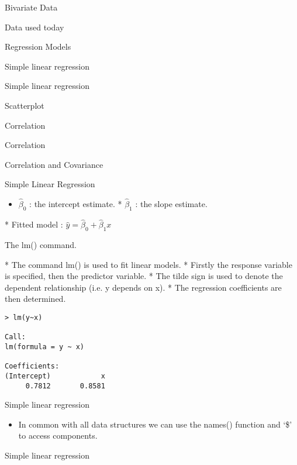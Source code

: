 \begin{slide}{Bivariate Data}
\begin{slide}{Data used today}
\begin{slide}{Regression Models}
\begin{slide}{Simple linear regression}
\begin{slide}{Simple linear regression}
\begin{slide}{Scatterplot}
\begin{slide}{Correlation}
\begin{slide}{Correlation}
\begin{slide}{Correlation and Covariance}
\begin{slide}{Simple Linear Regression}
\begin{itemize}
\begin{itemize}
\item
 $\hat{\beta}_{0}$ : the intercept estimate.
* $\hat{\beta}_{1}$ : the slope estimate.
\end{itemize}
* Fitted model : $\hat{y}=\hat{\beta}_{0} + \hat{\beta}_{1}x $
\end{itemize}





\begin{slide}{The lm() command.}
\begin{itemize}
* The command lm() is used to fit linear models. * Firstly the response variable is specified, then the predictor variable. * The tilde sign is used to denote the dependent relationship (i.e. y depends on x).
* The regression coefficients are then determined.
\end{itemize}
\begin{verbatim}
> lm(y~x)

Call:
lm(formula = y ~ x)

Coefficients:
(Intercept)            x
     0.7812       0.8581
\end{verbatim}



\begin{slide}{Simple linear regression}
\begin{itemize} * A more detailed model (i.e. more than just the coefficients) is generated in the form of a data object. * We can give a name to the model, and view all of the results of the calculation, including \begin {itemize} * The regression coefficients \item
The fitted $\hat{y}$ values (i.e. the estimated `y' values for the x date set) * The residuals (i.e. the differences between  the estimated `y' values and the observed `y' values). \end{itemize}\item
In common with all data structures we can use the names() function and `\$' to access components.\end{itemize}


\begin{slide}{Simple linear regression}


\end{slide}
\end{slide}
\end{slide}
\end{slide}
\end{slide}
\end{slide}
\end{slide}
\end{slide}
\end{slide}
\end{slide}
\end{slide}
\end{slide}
\end{slide}
